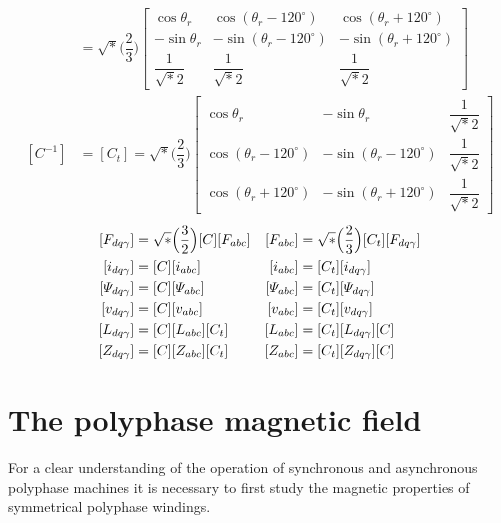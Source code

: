 \documentclass[a4paper,numbers=noenddot,12pt]{scrbook}
\begin{document}
    \begin{align*}
        [C] & = 
        \sqrt*{\Big( \dfrac{2}{3} \Big)}
        \begin{bmatrix}
            \cos \theta_r & \cos (\theta_r - 120^{\circ}) & \cos (\theta_r + 120^{\circ}) \\
            - \sin \theta_r & - \sin (\theta_r - 120^{\circ}) & - \sin (\theta_r + 120^{\circ}) \\
            \dfrac{1}{\sqrt*{2}} & \dfrac{1}{\sqrt*{2}} & \dfrac{1}{\sqrt*{2}}
        \end{bmatrix} \\
        [C^{-1}] & = [C_t] =
        \sqrt*{\Big( \dfrac{2}{3} \Big)} %
        \begin{bmatrix}
            \cos \theta_r & -\sin \theta_r & \dfrac{1}{\sqrt*{2}} \\[2ex]
            \cos (\theta_r - 120^{\circ}) & - \sin (\theta_r - 120^{\circ}) & \dfrac{1}{\sqrt*{2}} \\[2ex]
            \cos (\theta_r + 120^{\circ}) & - \sin (\theta_r + 120^{\circ}) & \dfrac{1}{\sqrt*{2}}
        \end{bmatrix}
    \end{align*}
    \begin{equation}
        \begin{aligned}\relax
            [F_{d q \gamma}] & = \sqrt*{\Big( \dfrac{3}{2} \Big)} [C] [F_{abc}] & [F_{abc}] & = \sqrt*{\Big( \dfrac{2}{3} \Big)} [C_t] [F_{d q \gamma}] \\
            [i_{d q \gamma}] & = [C] [i_{abc}] & [i_{abc}] & =[C_t] [i_{d q \gamma}] \\
            [\varPsi_{dq\gamma}] & = [C] [\varPsi_{abc}] & [\varPsi_{abc}] & = [C_t] [\varPsi_{d q \gamma}] \\
            [v_{dq\gamma}] & = [C] [v_{abc}]             & [v_{abc}] & = [C_t] [v_{d q \gamma}] \\
            [L_{dq\gamma}] & = [C] [L_{abc}] [C_t]       & [L_{abc}] & = [C_t] [L_{d q \gamma}] [C] \\
            [Z_{dq\gamma}] & = [C] [Z_{abc}] [C_t]       & [Z_{abc}] & = [C_t] [Z_{d q \gamma}] [C] 
        \end{aligned}
    \end{equation}

    \section{The polyphase magnetic field}
    For a clear understanding of the operation of synchronous and asynchronous polyphase machines it is necessary to first study the magnetic properties of symmetrical polyphase windings.
\end{document}
